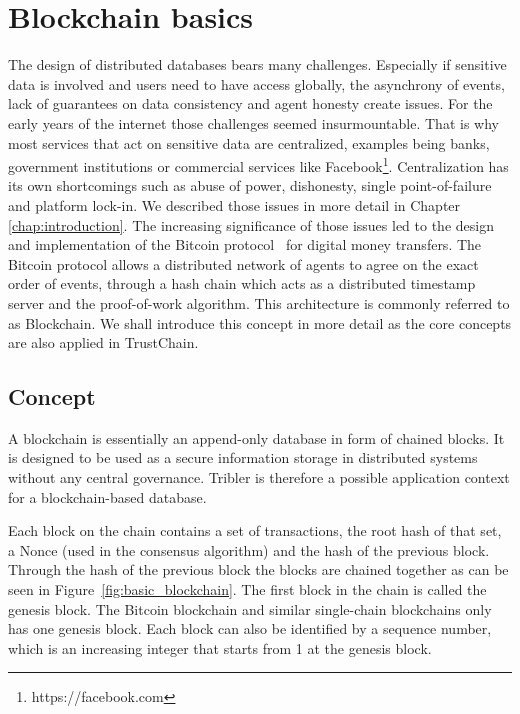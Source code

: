 \section{Blockchain basics}
The design of distributed databases bears many challenges. Especially if sensitive data is involved
and users need to have access globally, the asynchrony of events, lack of guarantees on data 
consistency and agent honesty create issues. For the early years of the internet those challenges seemed
insurmountable. That is why most services that act on sensitive data are centralized, examples being 
banks, government institutions or commercial services like Facebook\footnote{https://facebook.com}.
Centralization has its own shortcomings such as abuse of power, dishonesty, single point-of-failure
and platform lock-in. We described those issues in more detail in Chapter \ref{chap:introduction}.
The increasing significance of those issues led to the design and implementation of the Bitcoin 
protocol~\cite{nakamoto2008bitcoin} for digital money transfers. The Bitcoin protocol allows a distributed network of agents 
to agree on the exact order of events, through a hash chain which acts as a distributed timestamp 
server and the proof-of-work algorithm. This architecture is commonly referred to as Blockchain. We
shall introduce this concept in more detail as the core concepts are also applied in TrustChain.

\subsection{Concept}
A blockchain is essentially an append-only database in form of chained blocks. It is designed to be
used as a secure information storage in distributed systems without any central governance. Tribler
is therefore a possible application context for a blockchain-based database.

Each block on the chain contains a set of transactions, the root hash of that set, a Nonce (used in 
the consensus algorithm) and the hash of the previous block. Through the hash of the previous block the blocks are 
chained together as can be seen in Figure~\ref{fig:basic_blockchain}. The first block in the chain 
is called the genesis block. The Bitcoin blockchain and similar single-chain blockchains only has 
one genesis block. Each block can also be identified by a sequence number, which is an increasing 
integer that starts from 1 at the genesis block.

